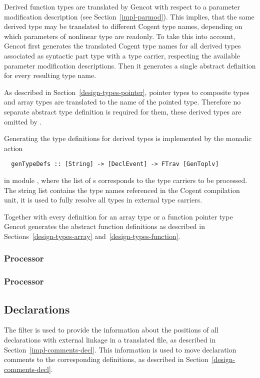 Derived function types are translated by Gencot with respect to a parameter modification description
(see Section~\ref{impl-parmod}). This implies, that the same derived type may be translated to different
Cogent type names, depending on which parameters of nonlinear type are readonly. To take this into account,
Gencot first generates the translated Cogent type names for all derived types associated 
as syntactic part type with a type carrier, respecting the available parameter modification descriptions.
Then it generates a single abstract definition for every resulting type name.

As described in Section~\ref{design-types-pointer}, pointer types to composite types and array types are translated
to the name of the pointed type. Therefore no separate abstract type definition is required for them, these
derived types are omitted by .

Generating the type definitions for derived types is implemented by the monadic action
\begin{verbatim}
  genTypeDefs :: [String] -> [DeclEvent] -> FTrav [GenToplv]
\end{verbatim}
in module , where the list of s corresponds to the type carriers
to be processed. The string list contains the type names referenced in the Cogent compilation unit, it is
used to fully resolve all types in external type carriers.

Together with every definition for an array type or a function pointer type Gencot generates the abstract
function definitions as described in Sections~\ref{design-types-array} and~\ref{design-types-function}.

\subsubsection{Processor }

\subsubsection{Processor }

\subsection{Declarations}
\label{impl-ccomps-decls}

The filter  is used to provide the information about the positions of all declarations with
external linkage in
a translated file, as described in Section~\ref{impl-comments-decl}. This information is used to move declaration
comments to the corresponding definitions, as described in Section~\ref{design-comments-decl}.

